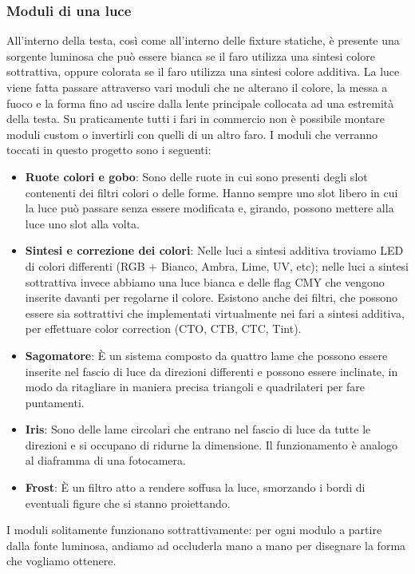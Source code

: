 \documentclass[main.tex]{subfiles}
\begin{document}
\subsubsection{Moduli di una luce}\label{subsec:1_1_modules}
All'interno della testa, così come all'interno delle fixture statiche, è presente una sorgente luminosa che può essere bianca se il faro utilizza una sintesi colore sottrattiva, oppure colorata se il faro utilizza una sintesi colore additiva. La luce viene fatta passare attraverso vari moduli che ne alterano il colore, la messa a fuoco e la forma fino ad uscire dalla lente principale collocata ad una estremità della testa. Su praticamente tutti i fari in commercio non è possibile montare moduli custom o invertirli con quelli di un altro faro. \newline
I moduli che verranno toccati in questo progetto sono i seguenti:
\begin{itemize}
    \item \textbf{Ruote colori e gobo}: Sono delle ruote in cui sono presenti degli slot contenenti dei filtri colori o delle forme. Hanno sempre uno slot libero in cui la luce può passare senza essere modificata e, girando, possono mettere  alla luce uno slot alla volta.
    \item \textbf{Sintesi e correzione dei colori}: Nelle luci a sintesi additiva troviamo LED di colori differenti (RGB + Bianco, Ambra, Lime, UV, etc); nelle luci a sintesi sottrattiva invece abbiamo una luce bianca e delle flag CMY che vengono inserite davanti per regolarne il colore. Esistono anche dei filtri, che possono essere sia sottrattivi che implementati virtualmente nei fari a sintesi additiva, per effettuare color correction (CTO, CTB, CTC, Tint).
    \item \textbf{Sagomatore}: È un sistema composto da quattro lame che possono essere inserite nel fascio di luce da direzioni differenti e possono essere inclinate, in modo da ritagliare in maniera precisa triangoli e quadrilateri per fare puntamenti.
    \item \textbf{Iris}: Sono delle lame circolari che entrano nel fascio di luce da tutte le direzioni e si occupano di ridurne la dimensione. Il funzionamento è analogo al diaframma di una fotocamera.
    \item \textbf{Frost}: È un filtro atto a rendere soffusa la luce, smorzando i bordi di eventuali figure che si stanno proiettando.
\end{itemize}
I moduli solitamente funzionano sottrattivamente: per ogni modulo a partire dalla fonte luminosa, andiamo ad occluderla mano a mano per disegnare la forma che vogliamo ottenere.
\end{document}
